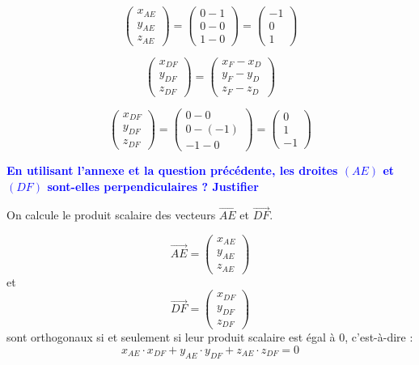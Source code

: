 \documentclass{exam}
\begin{document}
\begin{questions}
\[
  \begin{pmatrix}
    x_{AE} \\
    y_{AE} \\ 
    z_{AE}
  \end{pmatrix}
  = 
  \begin{pmatrix}
    0 - 1 \\
    0 - 0 \\ 
    1 - 0
  \end{pmatrix}
  = 
  \begin{pmatrix}
    - 1 \\
    0 \\ 
    1
  \end{pmatrix}
\]

\[
  \begin{pmatrix}
    x_{DF} \\
    y_{DF} \\ 
    z_{DF}
  \end{pmatrix}
  = 
  \begin{pmatrix}
    x_{F} - x_{D} \\
    y_{F} - y_{D} \\ 
    z_{F} - z_{D}
  \end{pmatrix}
\]

\[
  \begin{pmatrix}
    x_{DF} \\
    y_{DF} \\ 
    z_{DF}
  \end{pmatrix}
  = 
  \begin{pmatrix}
    0 - 0 \\
    0 - (-1) \\ 
    -1 - 0
  \end{pmatrix}
  = 
  \begin{pmatrix}
    0 \\
    1 \\ 
    -1
  \end{pmatrix}
\]

  \question[0.75] \textbf{\textcolor{blue}{En utilisant l'annexe et la question précédente, les droites $(AE)$ et $(DF)$ sont-elles perpendiculaires ? Justifier}}

  On calcule le produit scalaire des vecteurs $\overrightarrow{AE}$ et $\overrightarrow{DF}$.

  \[
  \overrightarrow{AE} = 
  \begin{pmatrix}
    x_{AE} \\
    y_{AE} \\ 
    z_{AE}
  \end{pmatrix}
\] et
\[
  \overrightarrow{DF} = 
  \begin{pmatrix}
    x_{DF} \\
    y_{DF} \\ 
    z_{DF}
  \end{pmatrix}
\]
sont orthogonaux si et seulement si leur produit scalaire est égal à 0, c'est-à-dire : 
\[
  x_{AE} \cdot x_{DF} + y_{AE} \cdot y_{DF} + z_{AE} \cdot z_{DF} = 0
\]


\end{questions}
\end{document}
